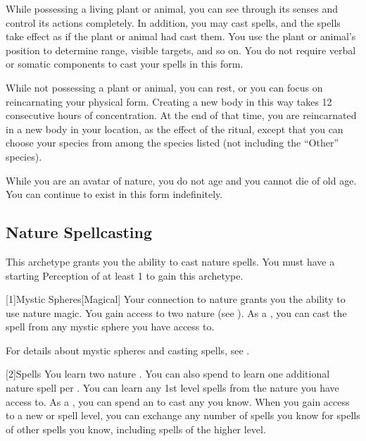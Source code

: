         While possessing a living plant or animal, you can see through its senses and control its actions completely.
        In addition, you may cast spells, and the spells take effect as if the plant or animal had cast them.
        You use the plant or animal's position to determine range, visible targets, and so on.
        You do not require verbal or somatic components to cast your spells in this form.

        While not possessing a plant or animal, you can rest, or you can focus on reincarnating your physical form.
        Creating a new body in this way takes 12 consecutive hours of concentration.
        At the end of that time, you are reincarnated in a new body in your location, as the effect of the  ritual, except that you can choose your species from among the species listed (not including the ``Other'' species).

        While you are an avatar of nature, you do not age and you cannot die of old age.
        You can continue to exist in this form indefinitely.

    \subsection{Nature Spellcasting}
        This archetype grants you the ability to cast nature spells.
        You must have a starting Perception of at least 1 to gain this archetype.

        [1]{Mystic Spheres}[Magical]
        Your connection to nature grants you the ability to use nature magic.
        You gain access to two nature  (see ).
        As a , you can cast the  spell from any mystic sphere you have access to.

        For details about mystic spheres and casting spells, see .

        [2]{Spells} You learn two nature .
        You can also spend  to learn one additional nature spell per .
        You can learn any 1st level spells from the nature  you have access to.
        As a , you can spend an  to cast any  you know.
        When you gain access to a new  or spell level, you can exchange any number of spells you know for spells of other spells you know, including spells of the higher level.

